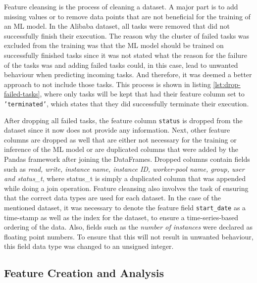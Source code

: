       Feature cleansing is the process of cleaning a dataset. 
      A major part is to add missing values or to remove data points that are not beneficial for the training of an ML model. 
      In the Alibaba dataset, all tasks were removed that did not successfully finish their execution. The reason why the cluster of failed tasks was excluded from the training was that the ML model should be trained on successfully finished tasks since it was not stated what the reason for the failure of the tasks was and adding failed tasks could, in this case, lead to unwanted behaviour when predicting incoming tasks. And therefore, it was deemed a better approach to not include those tasks. 
      This process is shown in listing \ref{lst:drop-failed-tasks}, where only tasks will be kept that had their feature column set to \texttt{'terminated'}, which states that they did successfully terminate their execution.
      
      After dropping all failed tasks, the feature column \texttt{status} is dropped from the dataset since it now does not provide any information.
      Next, other feature columns are dropped as well that are either not necessary for the training or inference of the ML model or are duplicated columns that were added by the Pandas framework after joining the DataFrames. Dropped columns contain fields such as \emph{read, write, instance name, instance ID, worker-pool name, group, user and status\_t}, where status\_t is simply a duplicated column that was appended while doing a join operation. Feature cleansing also involves the task of ensuring that the correct data types are used for each dataset. In the case of the mentioned dataset, it was necessary to denote the feature field \texttt{start\_date} as a time-stamp as well as the index for the dataset, to ensure a time-series-based ordering of the data. Also, fields such as the \emph{number of instances} were declared as floating point numbers. To ensure that this will not result in unwanted behaviour, this field data type was changed to an unsigned integer.

    \subsection{Feature Creation and Analysis}
    \label{sec:feature-creation-analysis-preprocessing-architecture}

